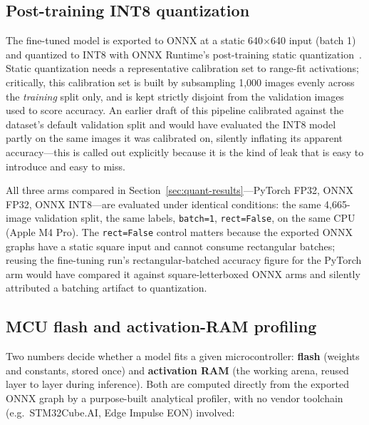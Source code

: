 \documentclass[11pt]{article}
\begin{document}
\subsection{Post-training INT8 quantization}

The fine-tuned model is exported to ONNX at a static 640$\times$640 input
(batch 1) and quantized to INT8 with ONNX Runtime's post-training static
quantization~\cite{onnxruntime, onnx_quantization}. Static quantization needs
a representative calibration set to range-fit activations; critically, this
calibration set is built by subsampling 1{,}000 images evenly across the
\emph{training} split only, and is kept strictly disjoint from the validation
images used to score accuracy. An earlier draft of this pipeline calibrated
against the dataset's default validation split and would have evaluated the
INT8 model partly on the same images it was calibrated on, silently
inflating its apparent accuracy---this is called out explicitly because it is
the kind of leak that is easy to introduce and easy to miss.

All three arms compared in Section~\ref{sec:quant-results}---PyTorch FP32,
ONNX FP32, ONNX INT8---are evaluated under identical conditions: the same
4{,}665-image validation split, the same labels, \texttt{batch=1},
\texttt{rect=False}, on the same CPU (Apple M4 Pro). The \texttt{rect=False}
control matters because the exported ONNX graphs have a static square input
and cannot consume rectangular batches; reusing the fine-tuning run's
rectangular-batched accuracy figure for the PyTorch arm would have compared
it against square-letterboxed ONNX arms and silently attributed a batching
artifact to quantization.

\subsection{MCU flash and activation-RAM profiling}
\label{sec:method-profiling}

Two numbers decide whether a model fits a given microcontroller: \textbf{flash}
(weights and constants, stored once) and \textbf{activation RAM} (the working
arena, reused layer to layer during inference). Both are computed directly
from the exported ONNX graph by a purpose-built analytical profiler, with no
vendor toolchain (e.g.\ STM32Cube.AI, Edge Impulse EON) involved:
\end{document}
